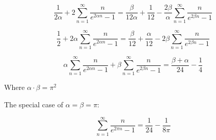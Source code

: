 ﻿\documentclass[a4paper]{article}
\begin{document}
$$
\frac{1}{2\alpha} + 2\sum_{n=1}^{\infty} \frac{n}{e^{2\alpha n}-1}
=\frac{\beta}{12\alpha}+ \frac{1}{12} -\frac{2\beta}{\alpha}\sum_{n=1}^{\infty} \frac{n}{e^{2\beta n}-1}
$$

$$
\frac{1}{2} + 2\alpha \sum_{n=1}^{\infty} \frac{n}{e^{2\alpha n}-1}
=\frac{\beta}{12}+ \frac{\alpha}{12} -2\beta\sum_{n=1}^{\infty} \frac{n}{e^{2\beta n}-1}
$$

$$\boxed{
\alpha \sum_{n=1}^{\infty} \frac{n}{e^{2\alpha n}-1}+\beta\sum_{n=1}^{\infty} \frac{n}{e^{2\beta n}-1}
=\frac{\beta+\alpha}{24}- \frac{1}{4}
}
$$

Where $\alpha \cdot \beta = \pi^2$

The special case of $\alpha=\beta=\pi$:

$$
\boxed{
\sum_{n=1}^{\infty} \frac{n}{e^{2\pi n}-1}
=\frac{1}{24}- \frac{1}{8\pi}
}
$$
\end{document}
